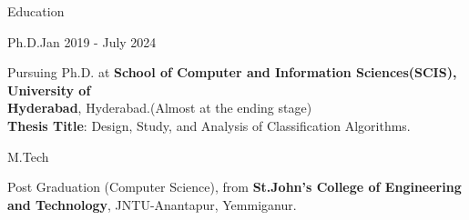 \documentclass{resume} %
\begin{document}

\begin{rSection}{Education}
	
\begin{rSubsection}{Ph.D.}{Jan 2019 - July 2024}{}{}	
	\item Pursuing Ph.D. at \textbf{School of Computer and Information Sciences(SCIS), University of \\ Hyderabad}, Hyderabad.(Almost at the ending stage) \\
	\textbf{Thesis Title}: Design, Study, and Analysis of Classification Algorithms.
\end{rSubsection}

\begin{rSubsection}{M.Tech}{}{}{}%
	\item Post Graduation (Computer Science), from \textbf{St.John's College of Engineering and Technology}, JNTU-Anantapur, Yemmiganur.
\end{rSubsection}

\end{rSection}


\end{document}
